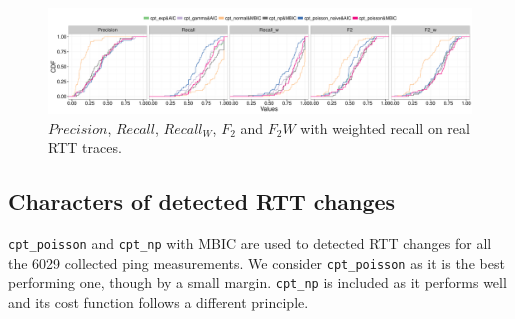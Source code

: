 \begin{landscape}
\begin{figure}[!ht]
\centering
\includegraphics[width=1.8\textwidth]{gfx/chap4/real_eval_bis.pdf}
\caption{$Precision$, $Recall$, $Recall_W$, $F_2$ and $F_2W$ with weighted recall on real RTT traces.}
\label{fig:real_eval}
\end{figure}
\end{landscape}

\subsection{Characters of detected RTT changes}
\label{sec:cpt_trace}
\texttt{cpt\_poisson} and \texttt{cpt\_np} with MBIC are used to detected RTT changes for all the 6029 collected ping measurements.
We consider \texttt{cpt\_poisson} as it is the best performing one, though by a small margin.
\texttt{cpt\_np} is included as it performs well and its cost function follows a different principle.


